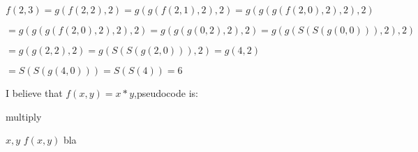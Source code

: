\documentclass{article}
\begin{document}
$f(2,3)
    = g(f(2,2),2)
    = g(g(f(2,1),2),2)
    = g(g(g(f(2,0),2),2),2)$
    
    $= g(g(g(f(2,0),2),2),2)
    = g(g(g(0,2),2),2)
    = g(g(S(S(g(0,0))),2),2)$
    
    $= g(g(2,2),2)
    = g(S(S(g(2,0))),2)
    = g(4,2)$
    
    $= S(S(g(4,0)))
    = S(S(4))
    = 6$
\\    
I believe that $f(x,y) = x*y$,pseudocode is:
\begin{algorithm}
\caption{multiply}
\begin{algorithmic}[1]
\Require $x,y$
\Ensure $f(x,y)$
\State bla
\EndIf 
\State {}
\EndFunction
\end{algorithmic}

\end{algorithm}
\end{document}

